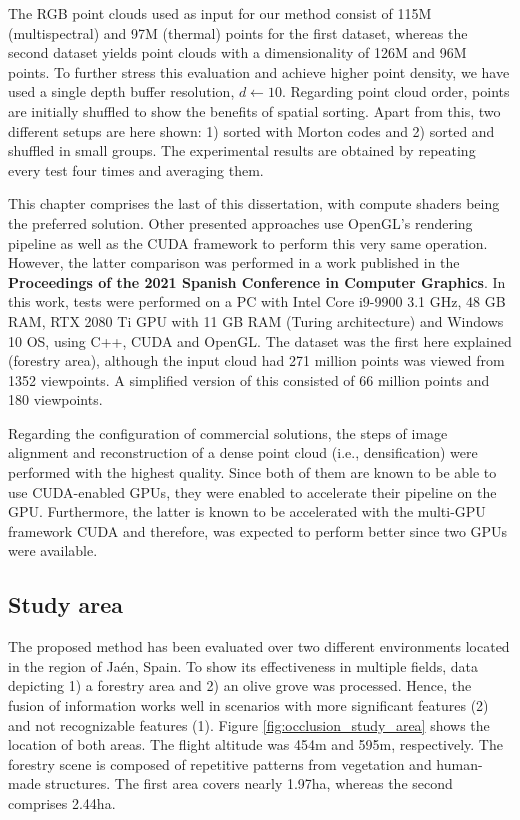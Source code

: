 The RGB point clouds used as input for our method consist of 115M (multispectral) and 97M (thermal) points for the first dataset, whereas the second dataset yields point clouds with a dimensionality of 126M and 96M points. To further stress this evaluation and achieve higher point density, we have used a single depth buffer resolution, $d\gets 10$. Regarding point cloud order, points are initially shuffled to show the benefits of spatial sorting. Apart from this, two different setups are here shown: 1) sorted with Morton codes and 2) sorted and shuffled in small groups. The experimental results are obtained by repeating every test four times and averaging them. 

\begin{kaobox}[frametitle=OpenGL and CUDA comparison]
This chapter comprises the last of this dissertation, with compute shaders being the preferred solution. Other presented approaches use OpenGL's rendering pipeline as well as the CUDA framework to perform this very same operation. However, the latter comparison was performed in a work published in the \textbf{Proceedings of the 2021 Spanish Conference in Computer Graphics}. In this work, tests were performed on a PC with Intel Core i9-9900 3.1 GHz, 48 GB RAM, RTX 2080 Ti GPU with 11 GB RAM (Turing architecture) and Windows 10 OS, using C++, CUDA and OpenGL. The dataset was the first here explained (forestry area), although the input cloud had 271 million points was viewed from 1352 viewpoints. A simplified version of this consisted of 66 million points and 180 viewpoints. 
\end{kaobox}

Regarding the configuration of commercial solutions, the steps of image alignment and reconstruction of a dense point cloud (i.e., densification) were performed with the highest quality. Since both of them are known to be able to use CUDA-enabled GPUs, they were enabled to accelerate their pipeline on the GPU. Furthermore, the latter is known to be accelerated with the multi-GPU framework CUDA and therefore, was expected to perform better since two GPUs were available.  
\subsection{Study area}

The proposed method has been evaluated over two different environments located in the region of Jaén, Spain. To show its effectiveness in multiple fields, data depicting 1) a forestry area and 2) an olive grove was processed. Hence, the fusion of information works well in scenarios with more significant features (2) and not recognizable features (1). Figure \ref{fig:occlusion_study_area} shows the location of both areas. The flight altitude was 454\si{\meter} and 595\si{\meter}, respectively. The forestry scene is composed of repetitive patterns from vegetation and human-made structures. The first area covers nearly 1.97\si{\hectare}, whereas the second comprises 2.44\si{\hectare}.

